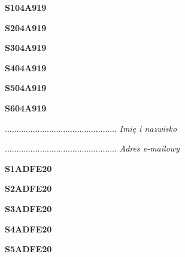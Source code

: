 \begin{turn}{90}\huge \textbf{S104A919}\end{turn}

\begin{turn}{90}\huge \textbf{S204A919}\end{turn}

\begin{turn}{90}\huge \textbf{S304A919}\end{turn}

\begin{turn}{90}\huge \textbf{S404A919}\end{turn}

\begin{turn}{90}\huge \textbf{S504A919}\end{turn}

\begin{turn}{90}\huge \textbf{S604A919}\end{turn}

\begin{turn}{90}\begin{minipage}{\linewidth} \vspace{20mm} ................................................  \textit{Imię i nazwisko}\end{minipage}\end{turn}

\begin{turn}{90}\begin{minipage}{\linewidth} \vspace{20mm} ................................................  \textit{Adres e-mailowy}\end{minipage}\end{turn}

\begin{turn}{90}\huge \textbf{S1ADFE20}\end{turn}

\begin{turn}{90}\huge \textbf{S2ADFE20}\end{turn}

\begin{turn}{90}\huge \textbf{S3ADFE20}\end{turn}

\begin{turn}{90}\huge \textbf{S4ADFE20}\end{turn}

\begin{turn}{90}\huge \textbf{S5ADFE20}\end{turn}

